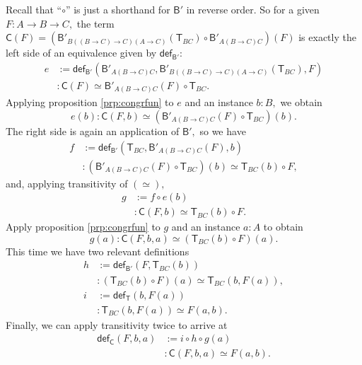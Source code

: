 \documentclass[a4paper]{article}
\theoremstyle{definition}
\theoremstyle{remark}
\renewcommand{\equiv}{\simeq}
\newcommand{\nm}{\mathsf}
\newcommand{\fndef}[1]{\nm{def}_{#1}}
\newcommand{\combinator}{\nm}
\newcommand{\appFun}{\combinator{T}}
\newcommand{\compFun}{\combinator{B'}}
\newcommand{\swapFun}{\combinator{C}}
\begin{document}
Recall that ``$\circ$'' is just a shorthand for $\compFun$ in reverse order. So for a given
$F : A \to B \to C,$ the term
$\swapFun(F) = (\compFun_{B((B{\to}C){\to}C)(A{\to}C)}(\appFun_{BC}) \circ \compFun_{A(B{\to}C)C})(F)$
is exactly the left side of an equivalence given by $\fndef{\compFun}$:
\begin{align*}
  e &:= \fndef{\compFun}(\compFun_{A(B{\to}C)C},\compFun_{B((B{\to}C){\to}C)(A{\to}C)}(\appFun_{BC}),F)\\
    &: \swapFun(F) \equiv \compFun_{A(B{\to}C)C}(F) \circ \appFun_{BC}.
\end{align*}
Applying proposition \ref{prp:congrfun} to $e$ and an instance $b : B,$ we obtain
\[e(b) : \swapFun(F,b) \equiv (\compFun_{A(B{\to}C)C}(F) \circ \appFun_{BC})(b).\]
The right side is again an application of $\compFun,$ so we have
\begin{align*}
  f &:= \fndef{\compFun}(\appFun_{BC},\compFun_{A(B{\to}C)C}(F),b)\\
    &: (\compFun_{A(B{\to}C)C}(F) \circ \appFun_{BC})(b) \equiv \appFun_{BC}(b) \circ F,
\end{align*}
and, applying transitivity of $(\equiv),$
\begin{align*}
  g &:= f \circ e(b)\\
    &: \swapFun(F,b) \equiv \appFun_{BC}(b) \circ F.
\end{align*}
Apply proposition \ref{prp:congrfun} to $g$ and an instance $a : A$ to obtain
\[g(a) : \swapFun(F,b,a) \equiv (\appFun_{BC}(b) \circ F)(a).\]
This time we have two relevant definitions
\begin{align*}
  h &:= \fndef{\compFun}(F,\appFun_{BC}(b))\\
    &: (\appFun_{BC}(b) \circ F)(a) \equiv \appFun_{BC}(b,F(a)),\\[1ex]
  i &:= \fndef{\appFun}(b,F(a))\\
    &: \appFun_{BC}(b,F(a)) \equiv F(a,b).
\end{align*}
Finally, we can apply transitivity twice to arrive at
\begin{align*}
  \fndef{\swapFun}(F,b,a) &:= i \circ h \circ g(a)\\
                          &: \swapFun(F,b,a) \equiv F(a,b).
\end{align*}
\end{document}
